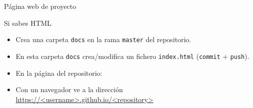 \documentclass[xcolor={usenames,svgnames,dvipsnames}]{beamer}
\begin{document}
\begin{frame}[fragile,label={sec:orgb0c6533}]{Página web de proyecto}
 \begin{block}{Si sabes HTML}
\begin{itemize}
\item Crea una carpeta \texttt{docs} en la rama \texttt{master} del repositorio.

\item En esta carpeta \texttt{docs} crea/modifica un fichero \texttt{index.html} (\texttt{commit} + \texttt{push}).

\item En la página del repositorio:
\end{itemize}

\begin{center}
\end{center}

\begin{itemize}
\item Con un navegador ve a la dirección \url{https://<username>.github.io/<repository>}
\end{itemize}
\end{block}
\end{frame}
\end{document}
